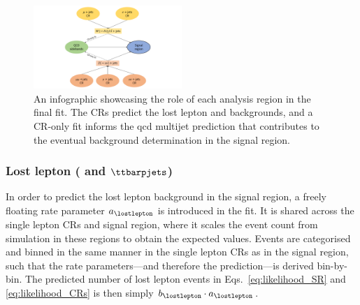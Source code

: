 \begin{figure}[htbp]
    \centering
    \includegraphics[width=0.5\textwidth]{figures/fit_overview.pdf}
    \caption[An infographic showcasing the role of each analysis region in the final fit]{An infographic showcasing the role of each analysis region in the final fit. The \glspl{CR} predict the lost lepton and \ztonunu backgrounds, and a \gls{CR}-only fit informs the \acrshort{qcd} multijet prediction that contributes to the eventual background determination in the signal region.}
    \label{fig:htoinv_fit_overview}
\end{figure}




\subsubsection{Lost lepton (\texorpdfstring{\PW}{W} and \texorpdfstring{$\ttbarpjets$}{ttbar plus jets})}
\label{subsubsec:htoinv_lost_lepton_bkg}

In order to predict the lost lepton background in the signal region, a freely floating rate parameter $a_{\lostlepton}$ is introduced in the fit. It is shared across the single lepton \glspl{CR} and signal region, where it scales the event count from simulation in these regions to obtain the expected values. Events are categorised and binned in the same manner in the single lepton \glspl{CR} as in the signal region, such that the rate parameters---and therefore the prediction---is derived bin-by-bin. The predicted number of lost lepton events in Eqs.~\ref{eq:likelihood_SR} and \ref{eq:likelihood_CRs} is then simply $b_{\lostlepton} \cdot a_{\lostlepton}$.




\subsubsection{\texorpdfstring{\ztonunupjets}{Z to nunu + jets}}
\label{subsubsec:htoinv_znunu_bkg}

